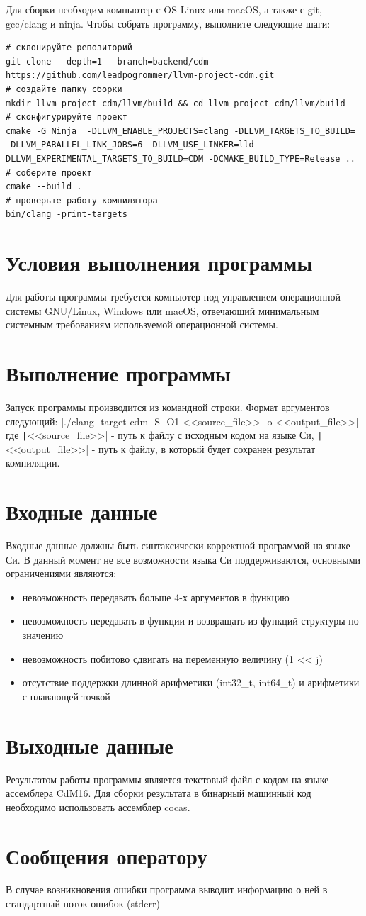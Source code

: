 \documentclass[a4paper,14pt]{extarticle}
\begin{document}
Для сборки необходим компьютер с OS Linux или macOS, а также с git, gcc/clang и ninja. Чтобы собрать программу, выполните следующие шаги:
\begin{verbatim}
# склонируйте репозиторий
git clone --depth=1 --branch=backend/cdm https://github.com/leadpogrommer/llvm-project-cdm.git
# создайте папку сборки
mkdir llvm-project-cdm/llvm/build && cd llvm-project-cdm/llvm/build
# сконфигурируйте проект
cmake -G Ninja  -DLLVM_ENABLE_PROJECTS=clang -DLLVM_TARGETS_TO_BUILD= -DLLVM_PARALLEL_LINK_JOBS=6 -DLLVM_USE_LINKER=lld -DLLVM_EXPERIMENTAL_TARGETS_TO_BUILD=CDM -DCMAKE_BUILD_TYPE=Release ..
# соберите проект
cmake --build .
# проверьте работу компилятора
bin/clang -print-targets 
\end{verbatim}

\section{Условия выполнения программы}
Для работы программы требуется компьютер под управлением операционной системы GNU/Linux, Windows или macOS, отвечающий минимальным системным требованиям используемой операционной системы.
\section{Выполнение программы}
Запуск программы производится из командной строки. Формат аргументов следующий:
|./clang -target cdm -S -O1 <<source_file>> -o <<output_file>>|
где \texttt|<<source_file>>| - путь к файлу с исходным кодом на языке Си, \texttt|<<output_file>>| - путь к файлу, в который будет сохранен результат компиляции.
\section{Входные данные}
Входные данные должны быть синтаксически корректной программой на языке Си. В данный момент не все возможности языка Си поддерживаются, основными ограничениями являются:
\begin{itemize}
\item невозможность передавать больше 4-х аргументов в функцию
\item невозможность передавать в функции и возвращать из функций структуры по значению
\item невозможность побитово сдвигать на переменную величину (1 << j)
\item отсутствие поддержки длинной арифметики (int32\_t, int64\_t) и арифметики с плавающей точкой
\end{itemize}
\section{Выходные данные}
Результатом работы программы является текстовый файл с кодом на языке ассемблера CdM16. Для сборки результата в бинарный машинный код необходимо использовать ассемблер cocas.
\section{Сообщения оператору}
В случае возникновения ошибки программа выводит информацию о ней в стандартный поток ошибок (stderr)
\end{document}
